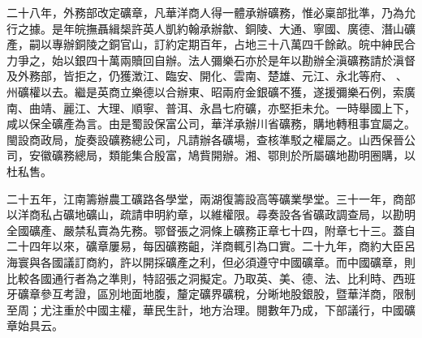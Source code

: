 \begin{pinyinscope}
二十八年，外務部改定礦章，凡華洋商人得一體承辦礦務，惟必稟部批準，乃為允行之據。是年皖撫聶緝椝許英人凱約翰承辦歙、銅陵、大通、寧國、廣德、潛山礦產，嗣以專辦銅陵之銅官山，訂約定期百年，占地三十八萬四千餘畝。皖中紳民合力爭之，始以銀四十萬兩贖回自辦。法人彌樂石亦於是年以勘辦全滇礦務請於滇督及外務部，皆拒之，仍獲澂江、臨安、開化、雲南、楚雄、元江、永北等府、、州礦權以去。繼是英商立樂德以合辦東、昭兩府金銀礦不獲，遂援彌樂石例，索廣南、曲靖、麗江、大理、順寧、普洱、永昌七府礦，亦堅拒未允。一時舉國上下，咸以保全礦產為言。由是蜀設保富公司，華洋承辦川省礦務，購地轉租事宜屬之。閩設商政局，旋奏設礦務總公司，凡請辦各礦場，查核準駁之權屬之。山西保晉公司，安徽礦務總局，類能集合殷富，鳩貲開辦。湘、鄂則於所屬礦地勘明圈購，以杜私售。

二十五年，江南籌辦農工礦路各學堂，兩湖復籌設高等礦業學堂。三十一年，商部以洋商私占礦地礦山，疏請申明約章，以維權限。尋奏設各省礦政調查局，以勘明全國礦產、嚴禁私賣為先務。鄂督張之洞條上礦務正章七十四，附章七十三。蓋自二十四年以來，礦章屢易，每因礦務齟，洋商輒引為口實。二十九年，商約大臣呂海寰與各國議訂商約，許以開採礦產之利，但必須遵守中國礦章。而中國礦章，則比較各國通行者為之準則，特詔張之洞擬定。乃取英、美、德、法、比利時、西班牙礦章參互考證，區別地面地腹，釐定礦界礦稅，分晰地股銀股，暨華洋商，限制至周；尤注重於中國主權，華民生計，地方治理。閱數年乃成，下部議行，中國礦章始具云。


\end{pinyinscope}